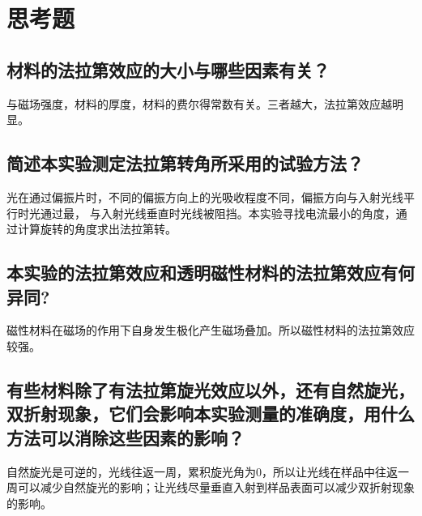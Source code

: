 \documentclass[a4paper]{article}
\begin{document}
\section{思考题}
\subsection{材料的法拉第效应的大小与哪些因素有关？}
与磁场强度，材料的厚度，材料的费尔得常数有关。三者越大，法拉第效应越明显。
\subsection{简述本实验测定法拉第转角所采用的试验方法？}
光在通过偏振片时，不同的偏振方向上的光吸收程度不同，偏振方向与入射光线平行时光通过最，
与入射光线垂直时光线被阻挡。本实验寻找电流最小的角度，通过计算旋转的角度求出法拉第转。
\subsection{本实验的法拉第效应和透明磁性材料的法拉第效应有何异同?}
磁性材料在磁场的作用下自身发生极化产生磁场叠加。所以磁性材料的法拉第效应较强。
\subsection{有些材料除了有法拉第旋光效应以外，还有自然旋光，双折射现象，它们会影响本实验测量的准确度，用什么方法可以消除这些因素的影响？}
自然旋光是可逆的，光线往返一周，累积旋光角为0，所以让光线在样品中往返一周可以减少自然旋光的影响；让光线尽量垂直入射到样品表面可以减少双折射现象的影响。

\nocite{jiaocai}

\end{document}
